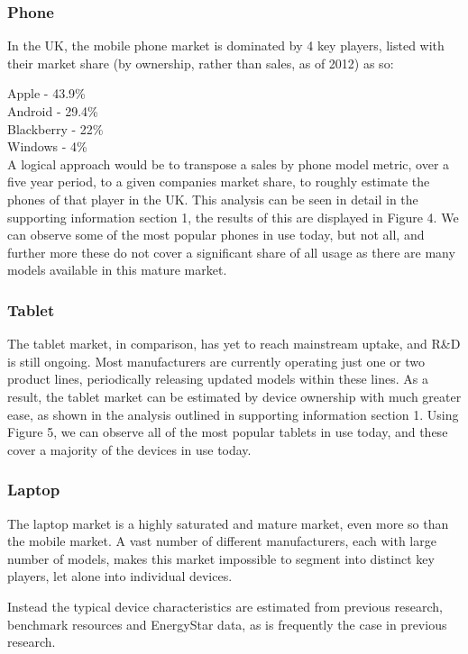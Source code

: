 \documentclass[conference]{IEEEtran}
\begin{document}
\subsubsection{Phone}

In the UK, the mobile phone market is dominated by 4 key players,
listed with their market share (by ownership, rather than sales, as of
2012) as so:

Apple - 43.9\%\\
Android - 29.4\%\\
Blackberry - 22\%\\
Windows - 4\%\\

A logical approach would be to transpose a sales by phone model
metric, over a five year period, to a given companies market share, to
roughly estimate the phones of that player in the UK. This analysis
can be seen in detail in the supporting information section 1, the
results of this are displayed in Figure 4. We can observe some of the
most popular phones in use today, but not all, and further more these
do not cover a significant share of all usage as there are many models
available in this mature market.

\subsubsection{Tablet}

The tablet market, in comparison, has yet to reach mainstream uptake,
and R\&D is still ongoing. Most manufacturers are currently operating
just one or two product lines, periodically releasing updated models
within these lines. As a result, the tablet market can be estimated by
device ownership with much greater ease, as shown in the analysis
outlined in supporting information section 1. Using Figure 5, we can
observe all of the most popular tablets in use today, and these cover
a majority of the devices in use today.

\subsubsection{Laptop}

The laptop market is a highly saturated and mature market, even more
so than the mobile market. A vast number of different manufacturers,
each with large number of models, makes this market impossible to
segment into distinct key players, let alone into individual devices.

Instead the typical device characteristics are estimated from previous
research, benchmark resources and EnergyStar data, as is frequently
the case in previous research.
\end{document}

